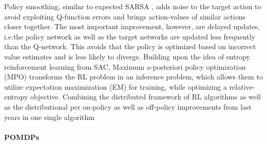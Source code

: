 		Policy smoothing, similar to expected SARSA \cite{VanSeijen2009}, adds noise to the target action to avoid exploiting Q-function errors and brings action-values of similar actions closer together.
		The most important improvement, however, are delayed updates, i.e.the policy network as well as the target networks are updated less frequently than the Q-network.
		This avoids that the policy is optimized based on incorrect value estimates and is less likely to diverge.	
		Building upon the idea of entropy reinforcement learning from SAC, Maximum a-posteriori policy optimization (MPO) \cite{Abdolmaleki2018} transforms the RL problem in an inference problem, which allows them to utilize expectation maximization (EM) for training, while optimizing a relative-entropy objective.
		Combining the distributed framework of RL algorithms \cite{Mnih2016} as well as the distributional per on-policy as well as off-policy improvements from last years in one single algorithm 
		
 	\paragraph{POMDPs}
